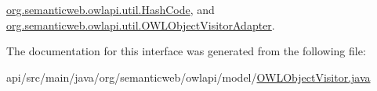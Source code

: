 \hyperlink{classorg_1_1semanticweb_1_1owlapi_1_1util_1_1_hash_code_a15e94197fe793a9cc55aaa188df7345a}{org.\-semanticweb.\-owlapi.\-util.\-Hash\-Code}, and \hyperlink{classorg_1_1semanticweb_1_1owlapi_1_1util_1_1_o_w_l_object_visitor_adapter_a90957c9a2b9932b44b992c1137f91cef}{org.\-semanticweb.\-owlapi.\-util.\-O\-W\-L\-Object\-Visitor\-Adapter}.



The documentation for this interface was generated from the following file\-:\begin{DoxyCompactItemize}
\item 
api/src/main/java/org/semanticweb/owlapi/model/\hyperlink{_o_w_l_object_visitor_8java}{O\-W\-L\-Object\-Visitor.\-java}\end{DoxyCompactItemize}
